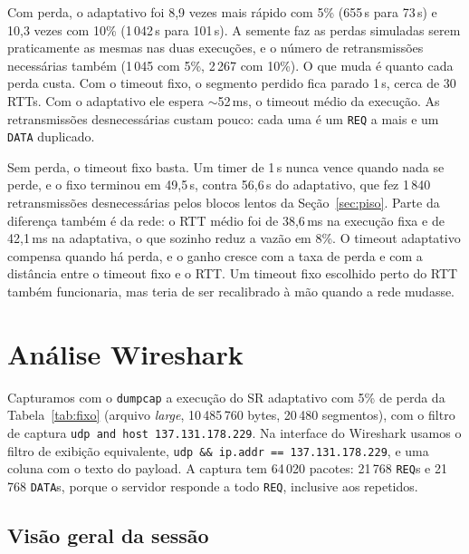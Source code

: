 \documentclass[11pt,a4paper]{article}
\begin{document}
Com perda, o adaptativo foi 8,9 vezes mais rápido com 5\% (655\,s para 73\,s)
e 10,3 vezes com 10\% (1\,042\,s para 101\,s). A semente faz as perdas
simuladas serem praticamente as mesmas nas duas execuções, e o número de
retransmissões necessárias também (1\,045 com 5\%, 2\,267 com 10\%). O que
muda é quanto cada perda custa. Com o timeout fixo, o segmento perdido fica
parado 1\,s, cerca de 30 RTTs. Com o adaptativo ele espera $\sim$52\,ms, o
timeout médio da execução. As retransmissões desnecessárias custam pouco: cada
uma é um \texttt{REQ} a mais e um \texttt{DATA} duplicado.

Sem perda, o timeout fixo basta. Um timer de 1\,s nunca vence quando nada se
perde, e o fixo terminou em 49,5\,s, contra 56,6\,s do adaptativo, que fez
1\,840 retransmissões desnecessárias pelos blocos lentos da
Seção~\ref{sec:piso}. Parte da diferença também é da rede: o RTT médio foi de
38,6\,ms na execução fixa e de 42,1\,ms na adaptativa, o que sozinho reduz a
vazão em 8\%. O timeout adaptativo compensa quando há perda, e o ganho cresce com a taxa de
perda e com a distância entre o timeout fixo e o RTT. Um timeout fixo
escolhido perto do RTT também funcionaria, mas teria de ser recalibrado à mão
quando a rede mudasse.

\section{Análise Wireshark}

Capturamos com o \texttt{dumpcap} a execução do SR adaptativo com 5\% de perda
da Tabela~\ref{tab:fixo} (arquivo \emph{large}, 10\,485\,760 bytes, 20\,480
segmentos), com o filtro de captura \texttt{udp and host 137.131.178.229}. Na
interface do Wireshark usamos o filtro de exibição equivalente,
\texttt{udp \&\& ip.addr == 137.131.178.229}, e uma coluna com o texto do
payload. A captura tem 64\,020 pacotes: 21\,768 \texttt{REQ}s e 21\,768
\texttt{DATA}s, porque o servidor responde a todo \texttt{REQ}, inclusive aos
repetidos.

\subsection{Visão geral da sessão}
\end{document}
